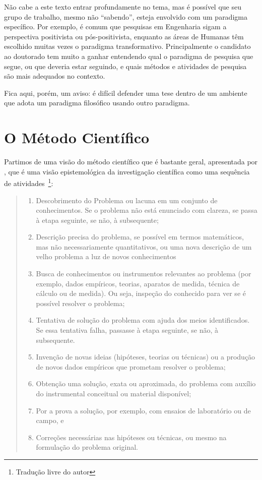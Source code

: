 Não cabe a este texto entrar profundamente no tema, mas é possível que seu  grupo de trabalho, mesmo não ``sabendo'', esteja envolvido com um paradigma específico. 
Por exemplo, é comum que pesquisas em Engenharia sigam a perspectiva positivista ou pós-positivista, enquanto as áreas de Humanas têm escolhido muitas vezes o paradigma transformativo.
Principalmente o candidato ao doutorado tem muito a ganhar entendendo qual o paradigma de pesquisa que segue, ou que deveria estar seguindo, e quais métodos e atividades de pesquisa são mais adequados no contexto.

Fica aqui, porém, um aviso: é difícil defender uma tese dentro de um ambiente que adota um paradigma filosófico usando outro paradigma. 

\section{O Método Científico}

Partimos de uma visão do método científico que é bastante geral, apresentada por \citet{Bunge2002}, que é uma visão epistemológica da investigação científica como uma sequência de atividades~\citep[p. 39-40]{Bunge2002}\footnote{Tradução livre do autor}:
\begin{quote}
\begin{enumerate}
    \item Descobrimento do Problema ou lacuna em um conjunto de conhecimentos. Se o problema não está enunciado com clareza, se passa à etapa seguinte, se não, à subsequente;
    \item Descrição precisa do problema, se possível em termos matemáticos, mas não necessariamente quantitativos, ou uma nova descrição de um velho problema a luz de novos conhecimentos 
    \item Busca de conhecimentos ou instrumentos relevantes ao problema (por exemplo, dados empíricos, teorias, aparatos de medida, técnica de cálculo ou de medida). Ou seja, inspeção do conhecido para ver se é possível resolver o problema;
    \item Tentativa de solução do problema com ajuda dos meios identificados. Se essa tentativa falha, passasse à etapa seguinte, se não, à subsequente.
    \item Invenção de novas ideias (hipóteses, teorias ou técnicas) ou a produção de novos dados empíricos que prometam resolver o problema;
    \item Obtenção uma solução, exata ou aproximada, do problema com auxílio do instrumental conceitual ou material disponível;
    \item Por a prova a solução, por exemplo, com ensaios de laboratório ou de campo, e
    \item Correções necessárias nas hipóteses ou técnicas, ou mesmo na formulação do problema original.
\end{enumerate}
\end{quote}

